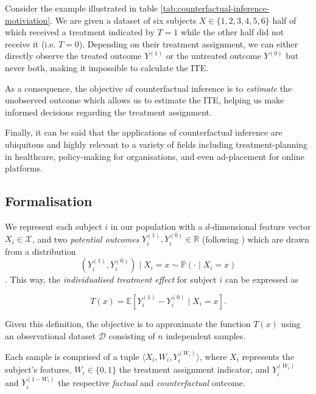Consider the example illustrated in table \ref{tab:counterfactual-inference-motiviation}. We are given a dataset of six subjects $X \in \{1, 2, 3, 4, 5, 6\}$ half of which received a treatment indicated by $T=1$ while the other half did not receive it (i.e. $T=0$). Depending on their treatment assignment, we can either directly observe the treated outcome $Y^{(1)}$ or the untreated outcome $Y^{(0)}$ but never both, making it impossible to calculate the ITE. 


As a consequence, the objective of counterfactual inference is to \emph{estimate} the unobserved outcome which allows us to estimate the ITE, helping us make informed decisions regarding the treatment assignment. 

Finally, it can be said that the applications of counterfactual inference are ubiquitous and highly relevant to a variety of fields including treatment-planning in healthcare, policy-making for organisations, and even ad-placement for online platforms. 


\subsection{Formalisation}
We represent each subject $i$ in our population  with a $d$-dimensional feature vector $X_i \in \mathcal{X}$, and two \emph{potential outcomes} $Y_{i}^{(1)}, Y_{i}^{(0)} \in \mathbb{R}$ (following \cite{potential-outcomes}) which are drawn from a distribution
\begin{equation}
 (Y_{i}^{(1)}, Y_{i}^{(0)}) \mid X_i = x \sim \mathbb{P}(\cdot \mid X_i = x)
 \end{equation}.
This way, the \emph{individualised treatment effect} for subject $i$ can be expressed as 

\begin{equation}
T(x) = \mathbb{E}[Y_{i}^{(1)} - Y_{i}^{(0)} \mid X_i = x] . \label{eq:ite}
\end{equation}

Given this definition, the objective is to approximate the function $T(x)$ using an observational dataset $\mathcal{D}$ consisting of $n$ independent samples. 

Each sample is comprised of a tuple $ \langle X_i, W_i, Y_{i}^{(W_i)} \rangle$, where $X_i$ represents the subject's features, $W_i \in \{0,1\}$ the treatment assignment indicator, and $Y_{i}^{(W_i)}$ and $Y_{i}^{(1 - W_i)}$ the respective \emph{factual} and \emph{counterfactual} outcome. 

